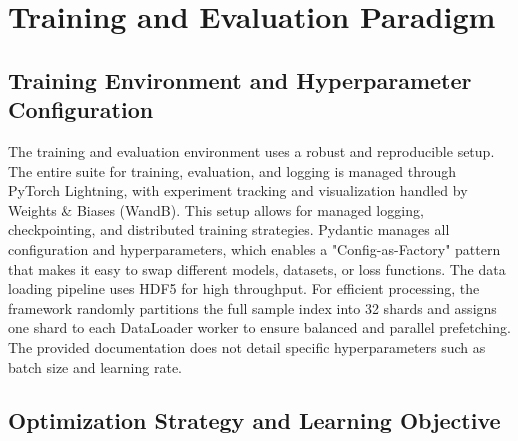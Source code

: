 \chapter{Training and Evaluation Paradigm}
\label{ch:experimental_design}

\section{Training Environment and Hyperparameter Configuration}
\label{sec:exp_training_env}
The training and evaluation environment uses a robust and reproducible setup. The entire suite for training, evaluation, and logging is managed through PyTorch Lightning, with experiment tracking and visualization handled by Weights \& Biases (WandB). This setup allows for managed logging, checkpointing, and distributed training strategies. Pydantic manages all configuration and hyperparameters, which enables a "Config-as-Factory" pattern that makes it easy to swap different models, datasets, or loss functions. The data loading pipeline uses HDF5 for high throughput. For efficient processing, the framework randomly partitions the full sample index into 32 shards and assigns one shard to each DataLoader worker to ensure balanced and parallel prefetching. The provided documentation does not detail specific hyperparameters such as batch size and learning rate.
 
\section{Optimization Strategy and Learning Objective}
\label{sec:exp_optimization}
